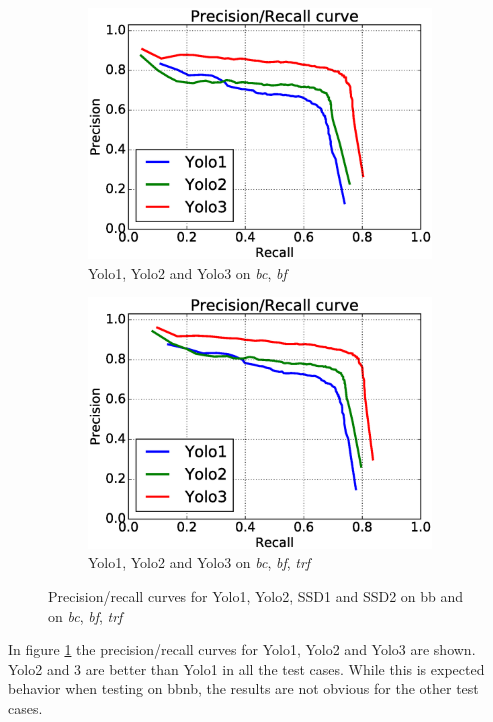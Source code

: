 \begin{figure}[h!]
\begin{subfigure}{.5\textwidth}
  \centering
  \includegraphics[width=0.8\linewidth]{results/case_tr_moor/prec_recall/bcbf.eps}
  \caption{Yolo1, Yolo2 and Yolo3 on \textit{bc}, \textit{bf}}
\end{subfigure}%
\begin{subfigure}{.5\textwidth}
  \centering
  \includegraphics[width=.8\linewidth]{results/case_tr_moor/prec_recall/bcbftrf.eps}
  \caption{Yolo1, Yolo2 and Yolo3 on \textit{bc}, \textit{bf}, \textit{trf}}
\end{subfigure}
\caption{Precision/recall curves for Yolo1, Yolo2, SSD1 and SSD2 on bb and on \textit{bc}, \textit{bf}, \textit{trf}}
\label{fig:prec_rec_case_moor}

\end{figure}

In figure \ref{fig:prec_rec_case_moor} the precision/recall curves for Yolo1, Yolo2 and Yolo3 are shown. Yolo2 and 3 are better than Yolo1 in all the test cases. While this is expected behavior when testing on bbnb, the results are not obvious for the other test cases. 

